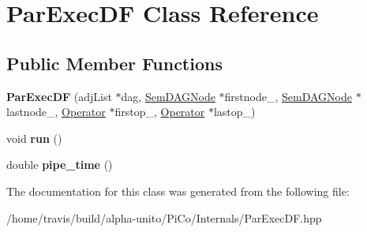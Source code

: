 \hypertarget{class_par_exec_d_f}{\section{\-Par\-Exec\-D\-F \-Class \-Reference}
\label{class_par_exec_d_f}
}
\subsection*{\-Public \-Member \-Functions}
\begin{DoxyCompactItemize}
\item 
\hypertarget{class_par_exec_d_f_aef7a4078b19e981b0f6d0654509e2f24}{{\bfseries \-Par\-Exec\-D\-F} (adj\-List $\ast$dag, \hyperlink{class_sem_d_a_g_node}{\-Sem\-D\-A\-G\-Node} $\ast$firstnode\-\_\-, \hyperlink{class_sem_d_a_g_node}{\-Sem\-D\-A\-G\-Node} $\ast$lastnode\-\_\-, \hyperlink{class_operator}{\-Operator} $\ast$firstop\-\_\-, \hyperlink{class_operator}{\-Operator} $\ast$lastop\-\_\-)}\label{class_par_exec_d_f_aef7a4078b19e981b0f6d0654509e2f24}

\item 
\hypertarget{class_par_exec_d_f_a5afb1f6732c4c84461a938b7d13fdf49}{void {\bfseries run} ()}\label{class_par_exec_d_f_a5afb1f6732c4c84461a938b7d13fdf49}

\item 
\hypertarget{class_par_exec_d_f_a57c35909797cac0488ce702d10237b98}{double {\bfseries pipe\-\_\-time} ()}\label{class_par_exec_d_f_a57c35909797cac0488ce702d10237b98}

\end{DoxyCompactItemize}


\-The documentation for this class was generated from the following file\-:\begin{DoxyCompactItemize}
\item 
/home/travis/build/alpha-\/unito/\-Pi\-Co/\-Internals/\-Par\-Exec\-D\-F.\-hpp\end{DoxyCompactItemize}
